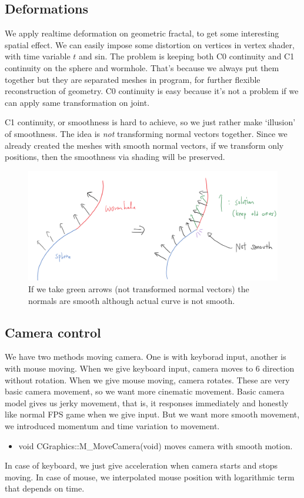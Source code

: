 \documentclass[a4paper]{article}
\begin{document}
\subsection{Deformations}
We apply realtime deformation on geometric fractal, to get some interesting spatial effect.
We can easily impose some distortion on vertices in vertex shader, with time variable $t$ and sin.
The problem is keeping both C0 continuity and C1 continuity on the sphere and wormhole.
That's because we always put them together but they are separated meshes in program, for further flexible reconstruction of geometry.
C0 continuity is easy because it's not a problem if we can apply same transformation on joint.

C1 continuity, or smoothness is hard to achieve, so we just rather make `illusion' of smoothness.
The idea is \textit{not} transforming normal vectors together.
Since we already created the meshes with smooth normal vectors, if we transform only positions, then the smoothness via shading will be preserved.

\begin{figure}[H]
\centering
\includegraphics[scale=0.5]{smooth.png}
\caption[q]{If we take green arrows (not transformed normal vectors) the normals are smooth although actual curve is not smooth.}
\label{fig:tree}
\end{figure}

\subsection{Camera control}
We have two methods moving camera.
One is with keyborad input, another is with mouse moving.
When we give keyboard input, camera moves to 6 direction without rotation.
When we give mouse moving, camera rotates.
These are very basic camera movement, so we want more cinematic movement.
Basic camera model gives us jerky movement, that is, it responses immediately and honestly like normal FPS game when we give input.
But we want more smooth movement, we introduced momentum and time variation to movement.
\begin{itemize}
  \item void CGraphics::M\_MoveCamera(void) moves camera with smooth motion.
\end{itemize}
In case of keyboard, we just give acceleration when camera starts and stops moving.
In case of mouse, we interpolated mouse position with logarithmic term that depends on time.
\end{document}
